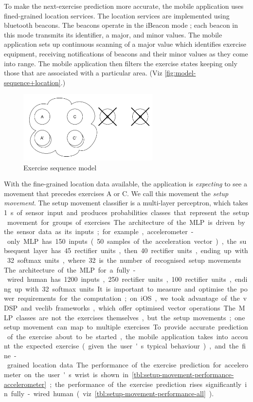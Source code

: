 \documentclass[a4paper, 10 pt, conference]{IEEEtran}
\begin{document}
To make the next-exercise prediction more accurate, the mobile application uses fined-grained location services. The location services are implemented using bluetooth beacons. The beacons operate in the iBeacon mode \cite{ibeacon}; each beacon in this mode transmits its identifier, a major, and minor values. The mobile application sets up continuous scanning of a major value which identifies exercise equipment, receiving notifications of beacons and their minor values as they come into range. The mobile application then filters the exercise states keeping only those that are associated with a particular area. (Viz \autoref{fig:model-sequence+location}.)

\begin{figure}[h]
	\begin{center}
		\caption{Exercise sequence model}
		\label{fig:model-sequence+location}
		\includegraphics[width=7cm,keepaspectratio]{ri-model-sequence+location.png}
	\end{center}
\end{figure}

With the fine-grained location data available, the application is \emph{expecting} to see a movement that precedes exercises A or C. We call this movement the \emph{setup movement}. The setup movement classifier is a multi-layer perceptron, which takes \SI{1}\second of sensor input and produces probabilities classes that represent the setup movement for groups of exercises. The architecture of the MLP is driven by the sensor data as its inputs; for example, accelerometer-only MLP has 150 inputs (50 samples of the acceleration vector), the subsequent layer has 45 rectifier units, then 40 rectifier units, ending up with 32 softmax units, where 32 is the number of recognised setup movements. The architecture of the MLP for a fully-wired human has 1200 inputs, 250 rectifier units, 100 rectifier units, ending up with 32 softmax units. It is important to measure and optimise the power requirements for the computation; on iOS, we took advantage of the vDSP and veclib frameworks, which offer optimised vector operations. The MLP classes are not the exercises themselves, but the setup movements; one setup movement can map to multiple exercises. To provide accurate prediction of the exercise about to be started, the mobile application takes into account the expected exercise (given the user's typical behaviour), and the fine-grained location data. The performance of the exercise prediction for accelerometer on the user's wrist is shown in \autoref{tbl:setup-movement-performance-accelerometer}; the performance of the exercise prediction rises significantly in fully-wired human (viz \autoref{tbl:setup-movement-performance-all}).
\end{document}
